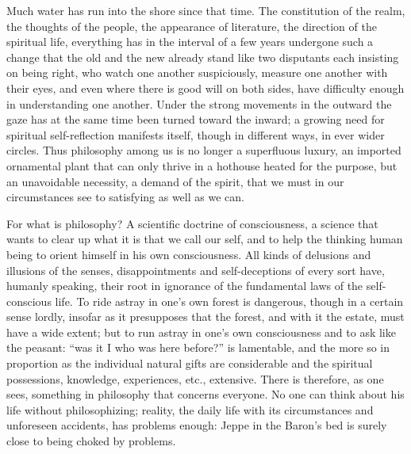 \documentclass[12pt,a4paper,openany]{book}
\newcommand{\opage}[1]{\marginnote{\footnotesize\textit{[#1]}}}
\begin{document}
Much water has run into the shore since that time.
The constitution of the realm, the thoughts of the people, the appearance of literature,
the direction of the spiritual life, everything has in the interval of a
few years undergone such a change that the old
and the new already stand like two disputants each insisting on being right, who watch
one another suspiciously, measure one another with their eyes,
and even where there is good will on both sides,
have difficulty enough in understanding one another. Under the
strong movements in the outward the gaze has at the same time been
turned toward the inward; a growing need for spiritual
self-reflection manifests itself, though in different
ways, in ever wider circles. Thus philosophy
among us is no longer a superfluous luxury, an imported
ornamental plant that can only thrive in a hothouse heated for the purpose,
but an unavoidable necessity, a demand of the spirit,
that we must in our circumstances see to satisfying
as well as we can.

For what is philosophy? A scientific doctrine of consciousness,
a science that wants to clear up what it is
that we call our self, and to help the thinking human being
to orient himself in his own consciousness. All
kinds of delusions and illusions of the senses, disappointments and self-deceptions
of every sort have, humanly speaking, their root
in ignorance of the fundamental laws of the self-conscious life. To
ride astray in one's own forest is dangerous, though in a certain
sense lordly, insofar as it presupposes that
the forest, and with it the estate, must have a wide
\setcounter{footnote}{0}%
\opage{387}extent; but to run astray in one's own consciousness and
to ask like the peasant: ``was it I who was here before?'' is
lamentable, and the more so in proportion as the individual
natural gifts are considerable and the spiritual possessions,
knowledge, experiences, etc., extensive. There is therefore,
as one sees, something in philosophy that concerns everyone.
No one can think about his life without philosophizing; reality,
the daily life with its circumstances and
unforeseen accidents, has problems enough: Jeppe in
the Baron's bed is surely close to being choked by problems.
\end{document}
